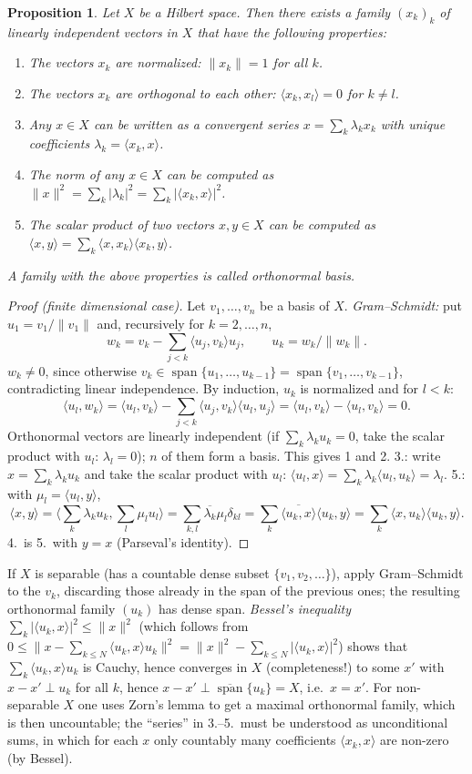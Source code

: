 \documentclass[11pt,a4paper]{article}
\numberwithin{equation}{section}
\newcommand{\ip}[2]{\langle #1, #2\rangle}
\newcommand{\conj}[1]{\overline{#1}}
\DeclareMathOperator{\spn}{span}
\theoremstyle{plain}
\newtheorem{proposition}[theorem]{Proposition}
\theoremstyle{definition}
\theoremstyle{plain}
\theoremstyle{definition}
\begin{document}
\begin{proposition}\label{prop:onb}
Let $X$ be a Hilbert space. Then there exists a family $(x_k)_k$ of linearly independent
vectors in $X$ that have the following properties:
\begin{enumerate}
\item The vectors $x_k$ are normalized: $\|x_k\|=1$ for all $k$.
\item The vectors $x_k$ are orthogonal to each other: $\ip{x_k}{x_l}=0$ for $k\ne l$.
\item Any $x\in X$ can be written as a convergent series $x=\sum_k\lambda_kx_k$ with unique
coefficients $\lambda_k=\ip{x_k}{x}$.
\item The norm of any $x\in X$ can be computed as $\|x\|^2=\sum_k|\lambda_k|^2=\sum_k|\ip{x_k}{x}|^2$.
\item The scalar product of two vectors $x,y\in X$ can be computed as
$\ip{x}{y}=\sum_k\ip{x}{x_k}\ip{x_k}{y}$.
\end{enumerate}
A family with the above properties is called \emph{orthonormal basis}.
\end{proposition}
\begin{proof}[Proof (finite dimensional case)]
Let $v_1,\dots,v_n$ be a basis of $X$. \emph{Gram--Schmidt:} put $u_1=v_1/\|v_1\|$ and,
recursively for $k=2,\dots,n$,
\[
w_k=v_k-\sum_{j<k}\ip{u_j}{v_k}u_j,\qquad u_k=w_k/\|w_k\| .
\]
$w_k\neq0$, since otherwise $v_k\in\spn\{u_1,\dots,u_{k-1}\}=\spn\{v_1,\dots,v_{k-1}\}$,
contradicting linear independence. By induction, $u_k$ is normalized and for $l<k$:
\[
\ip{u_l}{w_k}=\ip{u_l}{v_k}-\sum_{j<k}\ip{u_j}{v_k}\ip{u_l}{u_j}=\ip{u_l}{v_k}-\ip{u_l}{v_k}=0 .
\]
Orthonormal vectors are linearly independent (if $\sum_k\lambda_ku_k=0$, take the scalar
product with $u_l$: $\lambda_l=0$); $n$ of them form a basis. This gives 1 and 2.
3.: write $x=\sum_k\lambda_ku_k$ and take the scalar product with $u_l$:
$\ip{u_l}{x}=\sum_k\lambda_k\ip{u_l}{u_k}=\lambda_l$.
5.: with $\mu_l=\ip{u_l}{y}$,
\[
\ip{x}{y}=\Big\langle\sum_k\lambda_ku_k,\sum_l\mu_lu_l\Big\rangle
=\sum_{k,l}\conj{\lambda_k}\mu_l\delta_{kl}=\sum_k\conj{\ip{u_k}{x}}\ip{u_k}{y}
=\sum_k\ip{x}{u_k}\ip{u_k}{y}.
\]
4.\ is 5.\ with $y=x$ (Parseval's identity).
\end{proof}

\begin{addition}
If $X$ is separable (has a countable dense subset $\{v_1,v_2,\dots\}$), apply Gram--Schmidt
to the $v_k$, discarding those already in the span of the previous ones; the resulting
orthonormal family $(u_k)$ has dense span. \emph{Bessel's inequality}
$\sum_k|\ip{u_k}{x}|^2\le\|x\|^2$ (which follows from
$0\le\|x-\sum_{k\le N}\ip{u_k}{x}u_k\|^2=\|x\|^2-\sum_{k\le N}|\ip{u_k}{x}|^2$) shows that
$\sum_k\ip{u_k}{x}u_k$ is Cauchy, hence converges in $X$ (completeness!) to some $x'$ with
$x-x'\perp u_k$ for all $k$, hence $x-x'\perp\overline{\spn}\{u_k\}=X$, i.e.\ $x=x'$. For
non-separable $X$ one uses Zorn's lemma to get a maximal orthonormal family, which is then
uncountable; the ``series'' in 3.--5.\ must be understood as unconditional sums, in which
for each $x$ only countably many coefficients $\ip{x_k}{x}$ are non-zero (by Bessel).
\end{addition}
\end{document}
